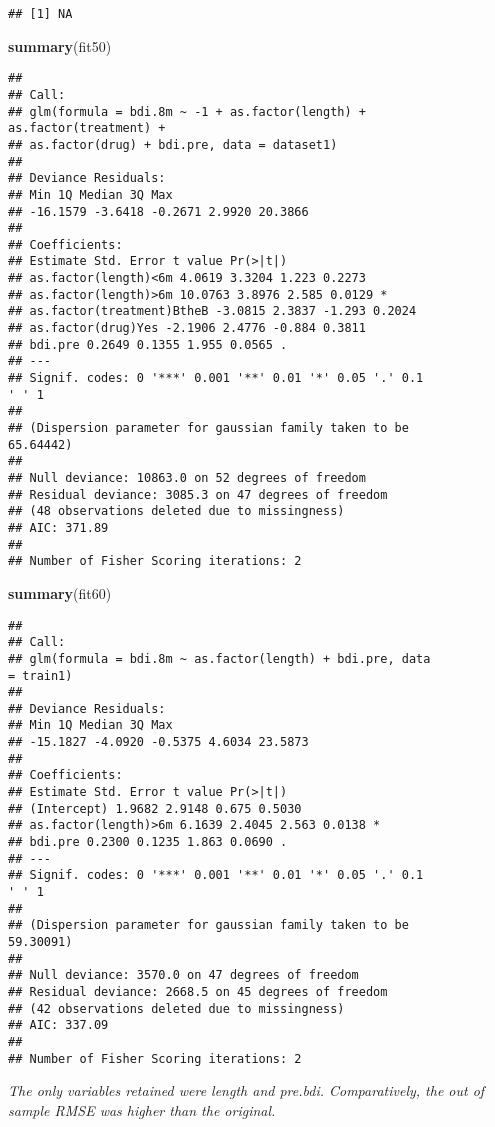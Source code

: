 \documentclass[
]{article}
\newenvironment{Shaded}{\begin{snugshade}}{\end{snugshade}}
\newcommand{\KeywordTok}[1]{\textcolor[rgb]{0.13,0.29,0.53}{\textbf{#1}}}
\newcommand{\NormalTok}[1]{#1}
\begin{document}
\begin{verbatim}
## [1] NA
\end{verbatim}

\begin{Shaded}
\begin{Highlighting}[]
\KeywordTok{summary}\NormalTok{(fit50)}
\end{Highlighting}
\end{Shaded}

\begin{verbatim}
##
## Call:
## glm(formula = bdi.8m ~ -1 + as.factor(length) +
as.factor(treatment) +
## as.factor(drug) + bdi.pre, data = dataset1)
##
## Deviance Residuals:
## Min 1Q Median 3Q Max
## -16.1579 -3.6418 -0.2671 2.9920 20.3866
##
## Coefficients:
## Estimate Std. Error t value Pr(>|t|)
## as.factor(length)<6m 4.0619 3.3204 1.223 0.2273
## as.factor(length)>6m 10.0763 3.8976 2.585 0.0129 *
## as.factor(treatment)BtheB -3.0815 2.3837 -1.293 0.2024
## as.factor(drug)Yes -2.1906 2.4776 -0.884 0.3811
## bdi.pre 0.2649 0.1355 1.955 0.0565 .
## ---
## Signif. codes: 0 '***' 0.001 '**' 0.01 '*' 0.05 '.' 0.1
' ' 1
##
## (Dispersion parameter for gaussian family taken to be
65.64442)
##
## Null deviance: 10863.0 on 52 degrees of freedom
## Residual deviance: 3085.3 on 47 degrees of freedom
## (48 observations deleted due to missingness)
## AIC: 371.89
##
## Number of Fisher Scoring iterations: 2
\end{verbatim}

\begin{Shaded}
\begin{Highlighting}[]
\KeywordTok{summary}\NormalTok{(fit60)}
\end{Highlighting}
\end{Shaded}

\begin{verbatim}
##
## Call:
## glm(formula = bdi.8m ~ as.factor(length) + bdi.pre, data
= train1)
##
## Deviance Residuals:
## Min 1Q Median 3Q Max
## -15.1827 -4.0920 -0.5375 4.6034 23.5873
##
## Coefficients:
## Estimate Std. Error t value Pr(>|t|)
## (Intercept) 1.9682 2.9148 0.675 0.5030
## as.factor(length)>6m 6.1639 2.4045 2.563 0.0138 *
## bdi.pre 0.2300 0.1235 1.863 0.0690 .
## ---
## Signif. codes: 0 '***' 0.001 '**' 0.01 '*' 0.05 '.' 0.1
' ' 1
##
## (Dispersion parameter for gaussian family taken to be
59.30091)
##
## Null deviance: 3570.0 on 47 degrees of freedom
## Residual deviance: 2668.5 on 45 degrees of freedom
## (42 observations deleted due to missingness)
## AIC: 337.09
##
## Number of Fisher Scoring iterations: 2
\end{verbatim}

\emph{The only variables retained were length and pre.bdi.
Comparatively, the out of sample RMSE was higher than the original.}
\end{document}
